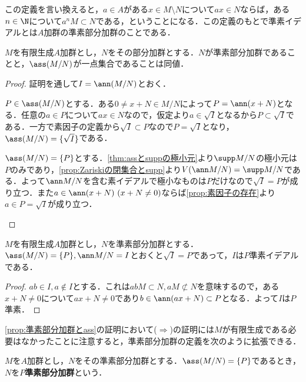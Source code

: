 この定義を言い換えると，$a\in A$がある$x\in M\setminus N$について$ax\in N$ならば，ある$n\in\N$について$a^n M\subset N$である，ということになる．この定義のもとで準素イデアルとは$A$加群の準素部分加群のことである．

\begin{prop}\label{prop:準素部分加群とass}
	$M$を有限生成$A$加群とし，$N$をその部分加群とする．$N$が準素部分加群であることと，$\ass (M/N)$が一点集合であることは同値．
\end{prop}

\begin{proof}
	証明を通して$I=\ann(M/N)$とおく．
	\begin{eqv}
		\item $P\in\ass (M/N)$とする．ある$0\neq x+N\in M/N$によって$P=\ann (x+N)$となる．任意の$a\in P$について$ax\in N$なので，仮定より$a\in\sqrt{I}$となるから$P\subset\sqrt{I}$である．一方で素因子の定義から$\sqrt{I}\subset P$なので$P=\sqrt{I}$となり，$\ass (M/N)=\{\sqrt{I}\}$である．
		
		\item $\ass(M/N)=\{P\}$とする．\ref{thm:assとsuppの極小元}より$\supp M/N$の極小元は$P$のみであり，\ref{prop:Zariskiの閉集合とsupp}より$V(\ann M/N)=\supp M/N$である．よって$\ann M/N$を含む素イデアルで極小なものは$P$だけなので$\sqrt{I}=P$が成り立つ．また$a\in\ann (x+N)~(x+N\neq0)$ならば\ref{prop:素因子の存在}より$a\in P=\sqrt{I}$が成り立つ．
	\end{eqv}
\end{proof}

\begin{prop}
	$M$を有限生成$A$加群とし，$N$を準素部分加群とする．$\ass (M/N)=\{P\},\ann M/N=I$とおくと$\sqrt{I}=P$であって，$I$は$P$準素イデアルである．
\end{prop}

\begin{proof}
	$ab\in I,a\not\in I$とする．これは$abM\subset N,aM\not\subset N$を意味するので，ある$x+N\neq0$について$ax+N\neq0$であり$b\in\ann (ax+N)\subset P$となる．よって$I$は$P$準素．
\end{proof}

\ref{prop:準素部分加群とass}の証明において($\Longrightarrow$)の証明には$M$が有限生成である必要はなかったことに注意すると，準素部分加群の定義を次のように拡張できる．

\begin{defi}
	$M$を$A$加群とし，$N$をその準素部分加群とする．$\ass(M/N)=\{P\}$であるとき，$N$を$P$\textbf{準素部分加群}という．
\end{defi}


